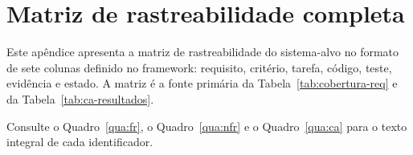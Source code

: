 
\chapter{Matriz de rastreabilidade completa}
\label{ap:rastreabilidade}

Este apêndice apresenta a matriz de rastreabilidade do sistema-alvo no formato
de sete colunas definido no framework: requisito, critério, tarefa, código,
teste, evidência e estado. A matriz é a fonte primária da
Tabela~\ref{tab:cobertura-req} e da Tabela~\ref{tab:ca-resultados}.

Consulte o Quadro~\ref{qua:fr}, o Quadro~\ref{qua:nfr} e o Quadro~\ref{qua:ca}
para o texto integral de cada identificador.

